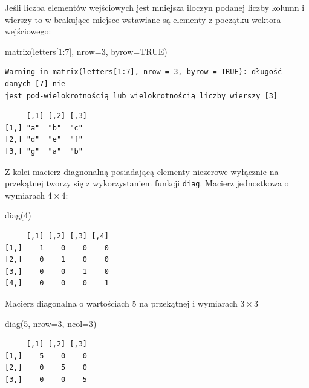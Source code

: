 \documentclass[
  letterpaper,
  DIV=11,
  numbers=noendperiod]{scrreprt}
\newenvironment{Shaded}{\begin{snugshade}}{\end{snugshade}}
\newcommand{\AttributeTok}[1]{\textcolor[rgb]{0.40,0.45,0.13}{#1}}
\newcommand{\ConstantTok}[1]{\textcolor[rgb]{0.56,0.35,0.01}{#1}}
\newcommand{\DecValTok}[1]{\textcolor[rgb]{0.68,0.00,0.00}{#1}}
\newcommand{\FunctionTok}[1]{\textcolor[rgb]{0.28,0.35,0.67}{#1}}
\newcommand{\NormalTok}[1]{\textcolor[rgb]{0.00,0.23,0.31}{#1}}
\newcommand{\SpecialCharTok}[1]{\textcolor[rgb]{0.37,0.37,0.37}{#1}}
\begin{document}
Jeśli liczba elementów wejściowych jest mniejsza iloczyn podanej liczby
kolumn i wierszy to w brakujące miejsce wstawiane są elementy z początku
wektora wejściowego:

\begin{Shaded}
\begin{Highlighting}[]
\FunctionTok{matrix}\NormalTok{(letters[}\DecValTok{1}\SpecialCharTok{:}\DecValTok{7}\NormalTok{], }\AttributeTok{nrow=}\DecValTok{3}\NormalTok{, }\AttributeTok{byrow=}\ConstantTok{TRUE}\NormalTok{)}
\end{Highlighting}
\end{Shaded}

\begin{verbatim}
Warning in matrix(letters[1:7], nrow = 3, byrow = TRUE): długość danych [7] nie
jest pod-wielokrotnością lub wielokrotnością liczby wierszy [3]
\end{verbatim}

\begin{verbatim}
     [,1] [,2] [,3]
[1,] "a"  "b"  "c" 
[2,] "d"  "e"  "f" 
[3,] "g"  "a"  "b" 
\end{verbatim}

Z kolei macierz diagnonalną posiadającą elementy niezerowe wyłącznie na
przekątnej tworzy się z wykorzystaniem funkcji \texttt{diag}. Macierz
jednostkowa o wymiarach \(4 \times 4\):

\begin{Shaded}
\begin{Highlighting}[]
\FunctionTok{diag}\NormalTok{(}\DecValTok{4}\NormalTok{)}
\end{Highlighting}
\end{Shaded}

\begin{verbatim}
     [,1] [,2] [,3] [,4]
[1,]    1    0    0    0
[2,]    0    1    0    0
[3,]    0    0    1    0
[4,]    0    0    0    1
\end{verbatim}

Macierz diagonalna o wartościach 5 na przekątnej i wymiarach
\(3 \times 3\)

\begin{Shaded}
\begin{Highlighting}[]
\FunctionTok{diag}\NormalTok{(}\DecValTok{5}\NormalTok{, }\AttributeTok{nrow=}\DecValTok{3}\NormalTok{, }\AttributeTok{ncol=}\DecValTok{3}\NormalTok{)}
\end{Highlighting}
\end{Shaded}

\begin{verbatim}
     [,1] [,2] [,3]
[1,]    5    0    0
[2,]    0    5    0
[3,]    0    0    5
\end{verbatim}
\end{document}
